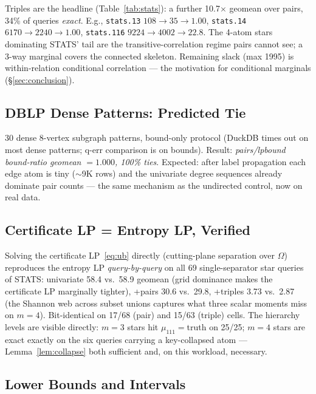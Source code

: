 Triples are the headline (Table~\ref{tab:stats}): a further
10.7$\times$ geomean over pairs, 34\% of queries \emph{exact}.
E.g., \texttt{stats.13} $108\to35\to1.00$, \texttt{stats.14}
$6170\to2240\to1.00$, \texttt{stats.116} $9224\to4002\to22.8$.  The
4-atom stars dominating STATS' tail are the transitive-correlation
regime pairs cannot see; a 3-way marginal covers the connected
skeleton.  Remaining slack (max 1995) is within-relation conditional
correlation --- the motivation for conditional marginals
(\S\ref{sec:conclusion}).

\subsection{DBLP Dense Patterns: Predicted Tie}
\label{sec:exp:dblp}

30 dense 8-vertex subgraph patterns, bound-only protocol (DuckDB
times out on most dense patterns; q-err comparison is on bounds).
Result: \emph{pairs/lpbound bound-ratio geomean $= 1.000$, 100\%
ties}.  Expected: after label propagation each edge atom is tiny
($\sim$9K rows) and the univariate degree sequences already dominate
pair counts --- the same mechanism as the undirected control, now on
real data.

\subsection{Certificate LP = Entropy LP, Verified}
\label{sec:exp:cert}

Solving the certificate LP~\eqref{eq:ub} directly (cutting-plane
separation over $\Omega$) reproduces the entropy LP
\emph{query-by-query} on all 69 single-separator star queries of
STATS: univariate 58.4 vs.\ 58.9 geomean (grid dominance makes the
certificate LP marginally tighter), +pairs 30.6 vs.\ 29.8, +triples
3.73 vs.\ 2.87 (the Shannon web across subset unions captures what
three scalar moments miss on $m{=}4$).  Bit-identical on 17/68
(pair) and 15/63 (triple) cells.  The hierarchy levels are visible
directly: $m{=}3$ stars hit $\mu_{111}{=}$truth on 25/25; $m{=}4$
stars are exact exactly on the six queries carrying a key-collapsed
atom --- Lemma~\ref{lem:collapse} both sufficient and, on this
workload, necessary.

\subsection{Lower Bounds and Intervals}
\label{sec:exp:lb}

